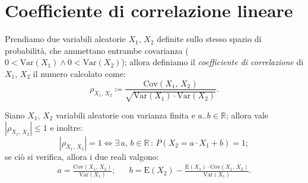     \section{Coefficiente di correlazione lineare}
        \begin{defn}
            Prendiamo due variabili aleatorie $X_1,\,X_2$ definite sullo stesso spazio di probabilità, che ammettano entrambe covarianza ($0<\text{Var}(X_1) \land 0<\text{Var}(X_2)$); allora definiamo il \emph{coefficiente di correlazione} di $X_1,\,X_2$ il numero calcolato come: \[
            \rho_{X_1,\,X_2} \coloneqq \frac{\text{Cov}(X_1,\,X_2)}{\sqrt{\text{Var}(X_1)\cdot \text{Var}(X_2)}}
            .\] 
        \end{defn}
        \begin{prty}
            Siano $X_1,\,X_2$ variabili aleatorie con varianza finita e $a..b \in \mathbb{R}$; allora vale $|\rho_{X_1,\,X_2}| \leq 1$ e inoltre: \[
                |\rho_{X_1,\,X_2}| = 1 \iff \exists\, a,\,b \in \mathbb{R}\,:\, P(X_2=a\cdot X_1+b) = 1
            ;\] se ciò si verifica, allora i due reali valgono:
            \begin{align*}
                a = \frac{\text{Cov}(X_1,\,X_2)}{\text{Var}(X_1)}; & &
                b = \text{E}(X_2) - \frac{\text{E}(X_1)\cdot \text{Cov}(X_1,\,X_2)}{\text{Var}(X_1)}
            .\end{align*}
        \end{prty}
